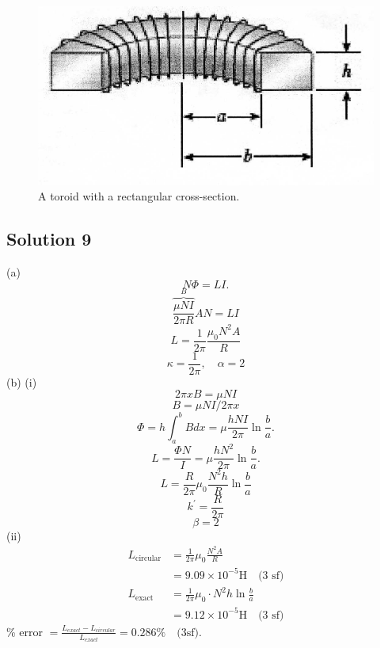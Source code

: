 \documentclass{article}
\begin{document}
\begin{figure}
	\centering
	\includegraphics[width=0.8\linewidth]{spho_book_TYS_images/2010q9_2.png}
	\caption{A toroid with a rectangular cross-section.} \label{2010q9_2}
\end{figure}
\subsection{Solution 9}
(a) 
$$N \Phi=L I .$$
$$\overbrace{\frac{\mu N I}{2 \pi R}}^{B} A N=L I$$
$$L=\frac{1}{2 \pi} \frac{\mu_{0}  N^{2} A}{R}$$
$$\kappa=\frac{1}{2 \pi}, \quad \alpha=2$$
(b) (i)
$$2 \pi x B=\mu N I$$
$$B=\mu N I / 2 \pi x$$
$$\Phi=h \int_{a}^{b} B d x=\mu \frac{h N I}{2 \pi} \ln \frac{b}{a} .$$
$$L=\frac{\Phi N}{I}=\mu \frac{h N^{2}}{2 \pi} \ln \frac{b}{a} .$$
$$L=\frac{R}{2 \pi} \mu_{0} \frac{N^{2} h}{R} \ln \frac{b}{a}$$
$$k^{\prime}=\frac{R}{2 \pi}$$
$$\beta=2$$
(ii) 
\begin{align}
	L_{\text{circular}} &= \frac{1}{2\pi} \mu_0 \frac{N^2 A}{R}\\
	&=9.09 \times 10^{-5} \mathrm{H} \quad \text{(3 sf)}\\
	L_{\text {exact }}&=\frac{1}{2 \pi} \mu_{0} \cdot N^{2} h\ln \frac{b}{a}\\
	&=9.12 \times 10^{-5} \mathrm{H} \quad \text{(3 sf)}
\end{align}
\% error $= \frac{L_{exact}-L_{circular}}{L_{exact}} = 0.286\% \quad \text{(3sf)}$.
\end{document}
